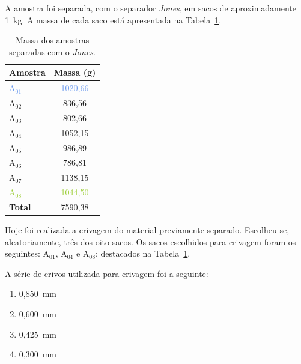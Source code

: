 A amostra foi separada, com o separador \textit{Jones}, em sacos de aproximadamente 1~kg.
A massa de cada saco está apresentada na Tabela~\ref{tab:massa_sacos}.

\begin{table}[!htbp]
    \centering
    \begin{tabular}{@{}lc@{}}
        \toprule
        \textbf{Amostra} & \textbf{Massa (g)} \\ \midrule
        \textcolor{CornflowerBlue}{A$_{01}$} & \textcolor{CornflowerBlue}{1020,66} \\
        A$_{02}$ & 836,56 \\
        A$_{03}$ & 802,66 \\
        \textcolor{YellowOrange}{A$_{04}$} & \textcolor{YellowOrange}{1052,15} \\
        A$_{05}$ & 986,89 \\
        A$_{06}$ & 786,81 \\
        A$_{07}$ & 1138,15 \\
        \textcolor{YellowGreen}{A$_{08}$} & \textcolor{YellowGreen}{1044,50} \\ \midrule
        \textbf{Total} & 7590,38 \\ \bottomrule
    \end{tabular}
    \caption{Massa dos amostras separadas com o \emph{Jones}.}
    \label{tab:massa_sacos}
\end{table}


\hrulefill

\pagebreak


Hoje foi realizada a crivagem do material previamente separado.
Escolheu-se, aleatoriamente, três dos oito sacos.
Os sacos escolhidos para crivagem foram os seguintes: A$_{01}$, A$_{04}$ e A$_{08}$; destacados na Tabela~\ref{tab:massa_sacos}.

A série de crivos utilizada para crivagem foi a seguinte:

\begin{minipage}{0.4\textwidth}
    \begin{enumerate}
        \item 0,850~mm
        \item 0,600~mm
    \end{enumerate}
\end{minipage}
\begin{minipage}{0.4\textwidth}
    \begin{enumerate}
        \setcounter{enumi}{2}
        \item 0,425~mm
        \item 0,300~mm
    \end{enumerate}
\end{minipage}

